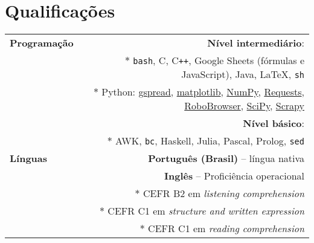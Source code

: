 \documentclass[11pt]{article}
\newcommand \grayrule{\color{lightgray} \vrule}
\newcommand \last{\leftskip0.5cm $\ast$ }
\begin{document}
\section*{Qualificações}
\begin{tabular}{>{\bf}L!{\grayrule}R}

 Programação & \textbf{Nível intermediário}: \\
             & \last \texttt{bash}, C, C\texttt{++}, Google Sheets (fórmulas e
             JavaScript), Java, \LaTeX, \texttt{sh} \\
             & \last Python:
                \href{https://github.com/burnash/gspread}{gspread},
                \href{http://matplotlib.org/}{matplotlib},
                \href{http://www.numpy.org/}{NumPy},
                \href{http://docs.python-requests.org/en/latest/#}{Requests},
                \href{https://github.com/jmcarp/robobrowser}{RoboBrowser},
                \href{http://www.scipy.org/}{SciPy},
                \href{http://scrapy.org/}{Scrapy} \\
             & \textbf{Nível básico}: \\
             & \last AWK, \texttt{bc}, Haskell, Julia, Pascal, Prolog,
             \texttt{sed} \\ [10pt]

     Línguas & \textbf{Português (Brasil)} -- língua nativa \\
             & \textbf{Inglês} -- Proficiência operacional \\
             & \last CEFR B2 em \textit{listening
             comprehension} \\
             & \last CEFR C1 em \textit{structure and written
             expression} \\
             & \last CEFR C1 em \textit{reading
             comprehension} \\
\end{tabular}
\end{document}
